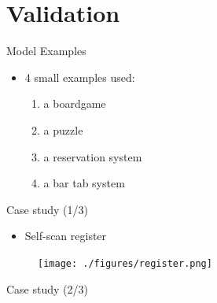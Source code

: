 \documentclass{FMTslides}
\begin{document}
\section[Validation]{Validation}

\begin{frame}{Model Examples}
\begin{itemize}[<+->]
  \item 4 small examples used:
  \begin{enumerate}
    \item a boardgame
    \item a puzzle
    \item a reservation system
    \item a bar tab system
  \end{enumerate}
\end{itemize}
\end{frame}

\begin{frame}{Case study (1/3)}
  \begin{itemize}[<+->]
  \item Self-scan register
\end{itemize}
\begin{figure}
\centering\texttt{[image: ./figures/register.png]}
\end{figure}
\end{frame}

\begin{frame}{Case study (2/3)}
  

\begin{figure}
\centering
\end{figure}
\end{frame}
\end{document}
